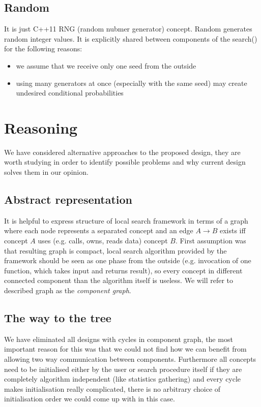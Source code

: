 \subsection{Random}

It is just C++11 RNG (random nubmer generator) concept.
Random generates random integer values.
It is explicitly shared between components of the search() for the following reasons:
\begin{itemize}
\item we assume that we receive only one seed from the outside
\item using many generators at once (especially with the same seed) may create undesired conditional probabilities
\end{itemize}

\section{Reasoning}

We have considered alternative approaches to the proposed design, they are
worth studying in order to identify possible problems and why current design
solves them in our opinion.

\subsection{Abstract representation}
It is helpful to express structure of local search framework in terms of a
graph where each node represents a separated concept and an edge $A \to B$
exists iff concept $A$ uses (e.g. calls, owns, reads data) concept $B$. First
assumption was that resulting graph is compact, local search algorithm provided
by the framework should be seen as one phase from the outside (e.g. invocation
of one function, which takes input and returns result), so every concept in
different connected component than the algorithm itself is useless. We will
refer to described graph as the \emph{component graph}.

\subsection{The way to the tree}
We have eliminated all designs with cycles in component graph, the most
important reason for this was that we could not find how we can benefit from
allowing two way communication between components. Furthermore all concepts
need to be initialised either by the user or search procedure itself if they are
completely algorithm independent (like statistics gathering) and every cycle
makes initialisation really complicated, there is no arbitrary choice of
initialisation order we could come up with in this case.

